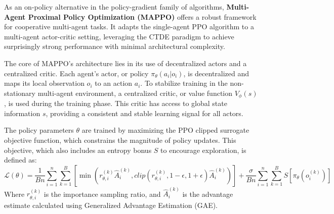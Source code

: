 
As an on-policy alternative in the policy-gradient family of algorithms, \textbf{Multi-Agent Proximal Policy Optimization (MAPPO)} \parencite{ppo_ctde} offers a robust framework for cooperative multi-agent tasks. It adapts the single-agent PPO algorithm to a multi-agent actor-critic setting, leveraging the CTDE paradigm to achieve surprisingly strong performance with minimal architectural complexity.


The core of MAPPO's architecture lies in its use of decentralized actors and a centralized critic. Each agent's actor, or policy $\pi_{\theta}(a_i | o_i)$, is decentralized and maps its local observation $o_i$ to an action $a_i$. To stabilize training in the non-stationary multi-agent environment, a centralized critic, or value function $V_{\phi}(s)$, is used during the training phase. This critic has access to global state information $s$, providing a consistent and stable learning signal for all actors.


The policy parameters $\theta$ are trained by maximizing the PPO clipped surrogate objective function, which constrains the magnitude of policy updates. This objective, which also includes an entropy bonus $S$ to encourage exploration, is defined as:
\begin{equation}
\label{eq:actor_loss}
\mathcal{L}(\theta) = \frac{1}{Bn} \sum_{i=1}^{n} \sum_{k=1}^{B} \left[ \min\left(r_{\theta,i}^{(k)} \hat{A}_i^{(k)}, clip(r_{\theta,i}^{(k)}, 1-\epsilon, 1+\epsilon) \hat{A}_i^{(k)}\right) \right] + \frac{\sigma}{Bn} \sum_{i=1}^{n} \sum_{k=1}^{B} S[\pi_{\theta}(o_i^{(k)})]
\end{equation}
Where $r_{\theta,i}^{(k)}$ is the importance sampling ratio, and $\hat{A}_i^{(k)}$ is the advantage estimate calculated using Generalized Advantage Estimation (GAE).

